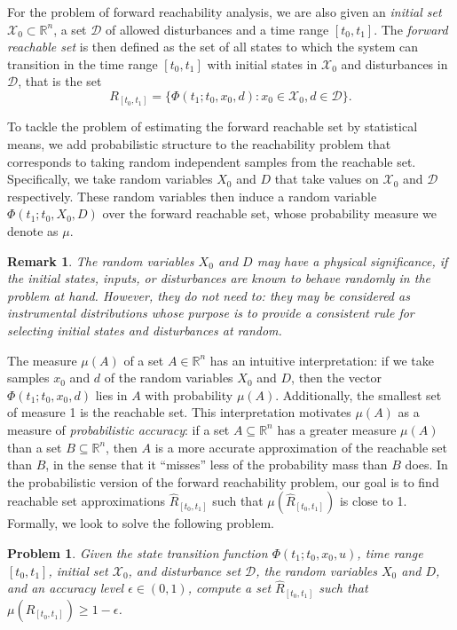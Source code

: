 \documentclass[letterpaper, 10 pt, conference]{ieeeconf}
\newcommand{\R}{\mathbb{R}}
\newcommand{\initialset}{\ensuremath{\mathcal{X}_0} }
\newcommand{\distset}{\ensuremath{\mathcal{D}} }
\newcommand{\rs}{\ensuremath{R_{[t_0,t_1]}}}
\newcommand{\ars}{\ensuremath{\hat{R}_{[t_0,t_1]}}}
\newtheorem{remark}{Remark}
\newtheorem{problem}{Problem}
\begin{document}
For the problem of forward reachability analysis, we are also given an
\emph{initial set} $\initialset\subset\R^n$, a set $\distset$ of allowed
disturbances and a time range $[t_0,t_1]$. The \emph{forward reachable set} is
then defined as the set of all states to which the system can transition in the
time range $[t_0,t_1]$ with initial states in $\initialset$ and disturbances in
$\distset$, that is the set
\begin{equation}
     \rs = \{\Phi(t_1;t_0,x_0, d) : x_0\in\initialset, d\in\distset\}.
\end{equation}

To tackle the problem of estimating the forward reachable set by statistical means, we
add probabilistic structure to the reachability problem that corresponds
to taking random independent samples from the reachable set. Specifically,
we take random variables $X_0$ and $D$ that take values on $\initialset$ and $\distset$ respectively. These random variables then
induce a random variable 
$\Phi(t_1;t_0, X_0, D)$ 
over the forward reachable
set, whose probability measure we denote as $\mu$.

\begin{remark}
    The random variables $X_0$ and $D$ may
have a physical significance, if the initial states, inputs, or disturbances are
known to behave randomly in the problem at hand. However, they do not need to:
they may be considered as \emph{instrumental distributions} whose purpose is to
provide a consistent rule for selecting initial states and disturbances
at random. 
%
%
\end{remark}

The measure $\mu(A)$ of a set $A\in\R^n$ has an intuitive interpretation: if we take samples $x_0$ and $d$ of the random
variables $X_0$ and $D$, then the vector $\Phi(t_1;t_0,x_0,d)$ lies in
$A$ with probability $\mu(A)$.
Additionally, the smallest set of measure 1 is the reachable set. 
This interpretation motivates $\mu(A)$ as a
measure of \emph{probabilistic accuracy}: if a set $A\subseteq\R^n$ has a
greater measure $\mu(A)$ than a set $B\subseteq\R^n$, then $A$ is a more
accurate approximation of the reachable set than $B$, in the sense that it
``misses'' less of the probability mass than $B$ does.
In the probabilistic
version of the forward reachability problem, our goal is to find
reachable set approximations $\ars$ such that $\mu(\ars)$ is close to 1.
Formally, we look to solve the following problem.
\begin{problem}\label{prb:frs_prob}
    Given the state transition function 
     $\Phi(t_1;t_0, x_0, u)$, time range $[t_0,t_1]$,
     initial set $\initialset$, and disturbance set
     $\distset$, the random variables $X_0$ and $D$, and an \emph{accuracy level}
    $\epsilon\in(0,1)$, compute a set $\ars$ such that $\mu(\ars) \ge 1-\epsilon$.
\end{problem}
\end{document}
